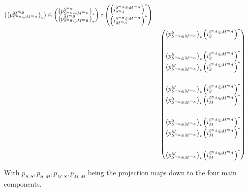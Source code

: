 \begin{remark}
\begin{align*}
{\begin{pmatrix}
                \tuple{ p_{S^{n_B} \oplus M^{m_B}}^{M^{m_B}} }_*
            \end{pmatrix} \oplus \begin{pmatrix}
                \tuple{ p_{S^{n_B} \oplus M^{m_B}}^{S^{n_B}} }_* \\
                \tuple{ p_{S^{n_B} \oplus M^{m_B}}^{M^{m_B}} }_*
            \end{pmatrix}
        } \circ
        \begin{pmatrix}
            \tuple{ i_{S^{n_A}}^{S^{n_A} \oplus M^{m_A}} }^* \\
            \tuple{ i_{M^{m_A}}^{S^{n_B} \oplus M^{m_B}} }^*
        \end{pmatrix} \\
        &= \begin{pmatrix} %
            \tuple{ p_{S^{n_A} \oplus M^{m_A}}^S }_* \tuple{ i_S^{S^{n_A} \oplus M^{m_A}} }^* \\
            \vdots \\
            \tuple{ p_{S^{n_A} \oplus M^{m_A}}^S }_* \tuple{ i_S^{S^{n_A} \oplus M^{m_A}} }^* \\
            \tuple{ p_{S^{n_A} \oplus M^{m_A}}^M }_* \tuple{ i_S^{S^{n_A} \oplus M^{m_A}} }^* \\
            \vdots \\
            \tuple{ p_{S^{n_A} \oplus M^{m_A}}^M }_* \tuple{ i_S^{S^{n_A} \oplus M^{m_A}} }^* \\
            \tuple{ p_{S^{n_A} \oplus M^{m_A}}^S }_* \tuple{ i_M^{S^{n_A} \oplus M^{m_A}} }^* \\
            \vdots \\
            \tuple{ p_{S^{n_A} \oplus M^{m_A}}^S }_* \tuple{ i_M^{S^{n_A} \oplus M^{m_A}} }^* \\
            \tuple{ p_{S^{n_A} \oplus M^{m_A}}^M }_* \tuple{ i_M^{S^{n_A} \oplus M^{m_A}} }^* \\
            \vdots \\
            \tuple{ p_{S^{n_A} \oplus M^{m_A}}^M }_* \tuple{ i_M^{S^{n_A} \oplus M^{m_A}} }^* \\
        \end{pmatrix}
    \end{align*}

    With \( p_{S, S}, p_{S, M}, p_{M, S}, p_{M, M} \) being the projection maps down to the four main components.
\end{remark}

